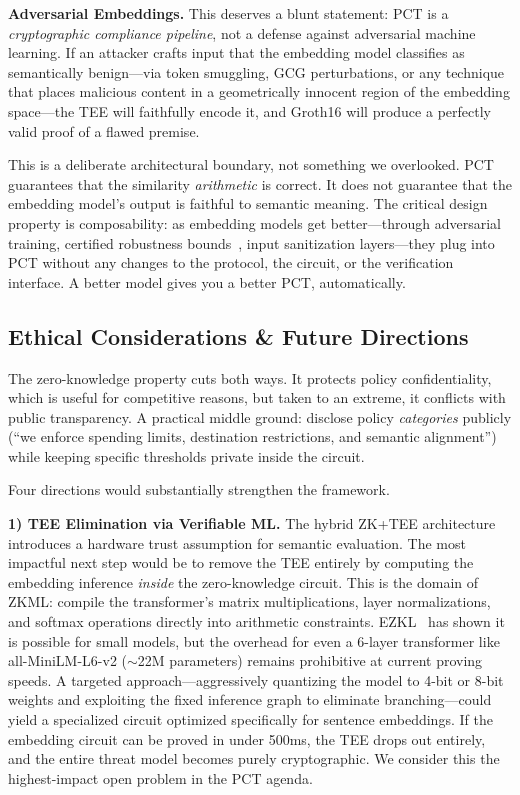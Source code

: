 \documentclass[10pt,conference]{IEEEtran}
\begin{document}
\textbf{Adversarial Embeddings.} This deserves a blunt statement: PCT is a \emph{cryptographic compliance pipeline}, not a defense against adversarial machine learning. If an attacker crafts input that the embedding model classifies as semantically benign---via token smuggling, GCG perturbations, or any technique that places malicious content in a geometrically innocent region of the embedding space---the TEE will faithfully encode it, and Groth16 will produce a perfectly valid proof of a flawed premise.

This is a deliberate architectural boundary, not something we overlooked. PCT guarantees that the similarity \emph{arithmetic} is correct. It does not guarantee that the embedding model's output is faithful to semantic meaning. The critical design property is composability: as embedding models get better---through adversarial training, certified robustness bounds~\cite{hendrycks2021unsolved}, input sanitization layers---they plug into PCT without any changes to the protocol, the circuit, or the verification interface. A better model gives you a better PCT, automatically.

\subsection{Ethical Considerations \& Future Directions}
\label{sec:future}

The zero-knowledge property cuts both ways. It protects policy confidentiality, which is useful for competitive reasons, but taken to an extreme, it conflicts with public transparency. A practical middle ground: disclose policy \emph{categories} publicly (``we enforce spending limits, destination restrictions, and semantic alignment'') while keeping specific thresholds private inside the circuit.

Four directions would substantially strengthen the framework.

\textbf{1) TEE Elimination via Verifiable ML.} The hybrid ZK+TEE architecture introduces a hardware trust assumption for semantic evaluation. The most impactful next step would be to remove the TEE entirely by computing the embedding inference \emph{inside} the zero-knowledge circuit. This is the domain of ZKML: compile the transformer's matrix multiplications, layer normalizations, and softmax operations directly into arithmetic constraints. EZKL~\cite{ezkl2023} has shown it is possible for small models, but the overhead for even a 6-layer transformer like all-MiniLM-L6-v2 ($\sim$22M parameters) remains prohibitive at current proving speeds. A targeted approach---aggressively quantizing the model to 4-bit or 8-bit weights and exploiting the fixed inference graph to eliminate branching---could yield a specialized circuit optimized specifically for sentence embeddings. If the embedding circuit can be proved in under 500ms, the TEE drops out entirely, and the entire threat model becomes purely cryptographic. We consider this the highest-impact open problem in the PCT agenda.
\end{document}
